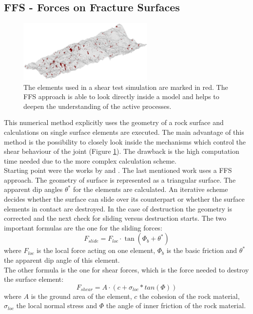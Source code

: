 \subsection{FFS - Forces on Fracture Surfaces}
\label{chap:NumPlatf:FFS}
\begin{figure}[htb!]
\begin{center}
\includegraphics[width=0.6\textwidth]{./figures/FFS_MarkedSurfaceElements.png}
\end{center}
\caption{The elements used in a shear test simulation are marked in red. The FFS approach is able to look directly inside a model and helps to deepen the understanding of the active processes.}
\label{Fig:FFS-MarkedElements}
\end{figure}
This numerical method explicitly uses the geometry of a rock surface and calculations on single surface elements are executed. The main advantage of this method is the possibility to closely look inside the mechanisms which control the shear behaviour of the joint (Figure \ref{Fig:FFS-MarkedElements}). The drawback is the high computation time needed due to the more complex calculation scheme.\\
Starting point were the works by \cite{Fathi2016} and \cite{Casagrande2017}. The last mentioned work uses a FFS approach. The geometry of surface is represented as a triangular surface. The apparent dip angles $\theta^\ast$ for the elements are calculated. An iterative scheme decides whether the surface can slide over its counterpart or whether the surface elements in contact are destroyed. In the case of destruction the geometry is corrected and the next check for sliding versus destruction starts. The two important formulas are the one for the sliding forces: 
\begin{equation}
F_{slide}=F_{loc} \cdot \tan (\Phi_b + \theta^\ast)
\end{equation}
where $F_{loc}$ is the local force acting on one element, $\Phi_b$ is the basic friction and $\theta^\ast$ the apparent dip angle of this element.\\
The other formula is the one for shear forces, which is the force needed to destroy the surface element:
\begin{equation}\label{eq:shear}
F_{shear}=A \cdot (c + \sigma_{loc}*tan(\Phi))
\end{equation}
where $A$ is the ground area of the element, $c$ the cohesion of the rock material, $\sigma_{loc}$ the local normal stress and $\Phi$ the angle of inner friction of the rock material.



